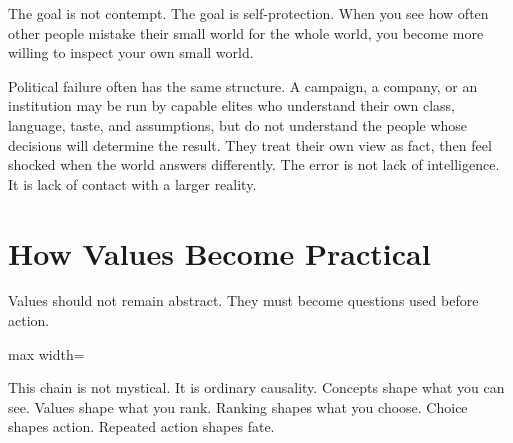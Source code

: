 The goal is not contempt. The goal is self-protection. When you see how often other people mistake their small world for the whole world, you become more willing to inspect your own small world.

Political failure often has the same structure. A campaign, a company, or an institution may be run by capable elites who understand their own class, language, taste, and assumptions, but do not understand the people whose decisions will determine the result. They treat their own view as fact, then feel shocked when the world answers differently. The error is not lack of intelligence. It is lack of contact with a larger reality.

\section*{How Values Become Practical}

Values should not remain abstract. They must become questions used before action.

\begin{center}
\begin{adjustbox}{max width=\linewidth}
\end{adjustbox}
\end{center}

This chain is not mystical. It is ordinary causality. Concepts shape what you can see. Values shape what you rank. Ranking shapes what you choose. Choice shapes action. Repeated action shapes fate.

